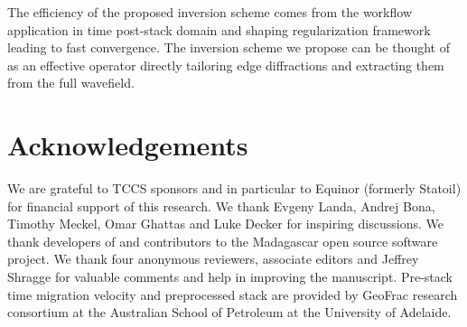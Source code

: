 The efficiency of the proposed inversion scheme comes from the workflow application in time post-stack domain and
shaping regularization framework leading to fast convergence.
The inversion scheme we propose can be thought of as an effective operator
directly tailoring edge diffractions and extracting them from the full wavefield.

\section{Acknowledgements}
We are grateful to TCCS sponsors and in particular to Equinor (formerly Statoil) for financial support of this research. We thank Evgeny Landa, Andrej Bona, Timothy Meckel, Omar Ghattas
and Luke Decker for inspiring discussions. We thank developers of and contributors to the Madagascar open source software project.
We thank four anonymous reviewers, associate editors and Jeffrey Shragge for valuable comments and help in improving the manuscript.
Pre-stack time migration velocity and preprocessed stack are provided by GeoFrac research consortium at the Australian School of Petroleum at the University of Adelaide.



